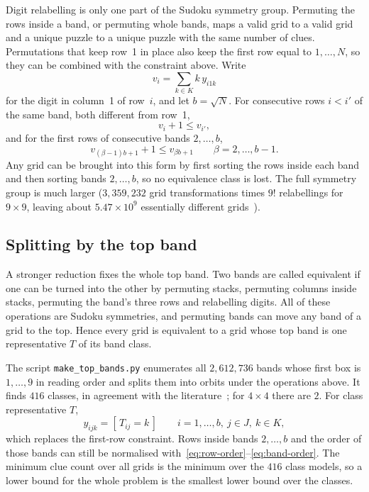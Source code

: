 \documentclass[11pt]{article}
\newcommand{\target}{y}
\begin{document}
Digit relabelling is only one part of the Sudoku symmetry group. Permuting the rows inside a band, or permuting whole bands, maps a valid grid to a valid grid and a unique puzzle to a unique puzzle with the same number of clues. Permutations that keep row~1 in place also keep the first row equal to $1,\ldots,N$, so they can be combined with the constraint above. Write
\[
v_i=\sum_{k\in K}k\,\target_{i1k}
\]
for the digit in column~1 of row~$i$, and let $b=\sqrt N$. For consecutive rows $i<i'$ of the same band, both different from row~1,
\begin{equation}
v_i+1\le v_{i'},
\label{eq:row-order}
\end{equation}
and for the first rows of consecutive bands $2,\ldots,b$,
\begin{equation}
v_{(\beta-1)b+1}+1\le v_{\beta b+1}
\qquad \beta=2,\ldots,b-1.
\label{eq:band-order}
\end{equation}
Any grid can be brought into this form by first sorting the rows inside each band and then sorting bands $2,\ldots,b$, so no equivalence class is lost. The full symmetry group is much larger ($3{,}359{,}232$ grid transformations times $9!$ relabellings for $9\times9$, leaving about $5.47\times10^9$ essentially different grids~\cite{jarvis}).

\subsection{Splitting by the top band}

A stronger reduction fixes the whole top band. Two bands are called equivalent if one can be turned into the other by permuting stacks, permuting columns inside stacks, permuting the band's three rows and relabelling digits. All of these operations are Sudoku symmetries, and permuting bands can move any band of a grid to the top. Hence every grid is equivalent to a grid whose top band is one representative $T$ of its band class.

The script \texttt{make\_top\_bands.py} enumerates all $2{,}612{,}736$ bands whose first box is $1,\ldots,9$ in reading order and splits them into orbits under the operations above. It finds $416$ classes, in agreement with the literature~\cite{mcguire}; for $4\times4$ there are $2$. For class representative $T$,
\begin{equation}
\target_{ijk}=[\,T_{ij}=k\,]\qquad i=1,\ldots,b,\ j\in J,\ k\in K,
\label{eq:top-band}
\end{equation}
which replaces the first-row constraint. Rows inside bands $2,\ldots,b$ and the order of those bands can still be normalised with~\eqref{eq:row-order}--\eqref{eq:band-order}. The minimum clue count over all grids is the minimum over the $416$ class models, so a lower bound for the whole problem is the smallest lower bound over the classes.
\end{document}
